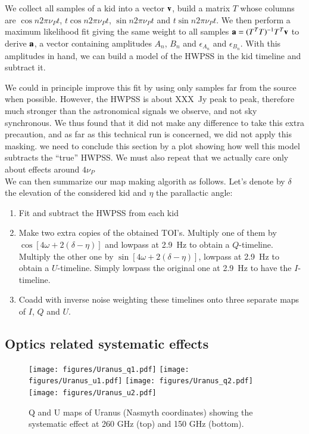 \documentclass[twocolumn,traditabstract]{aa}
\begin{document}
{We collect all samples of a kid into a vector ${\bf v}$, build a matrix $T$
whose columns are $\cos n2\pi\nu_Pt$, $t\cos n2\pi\nu_Pt$, $\sin n2\pi\nu_Pt$
and $t\sin n2\pi\nu_Pt$. We then perform a maximum likelihood fit giving the
same weight to all samples ${\bf a} =
(T^TT)^{-1}T^T{\bf v}$ to derive ${\bf a}$, a vector containing amplitudes $A_n$,
$B_n$ and $\epsilon_{A_n}$ and $\epsilon_{B_n}$. With this amplitudes in hand,
we can build a model of the HWPSS in the kid timeline and subtract it.

We could in principle improve this fit by using only samples far from the source
when possible. However, the HWPSS is about {\color{red}XXX~Jy} peak to peak,
therefore much stronger than the astronomical signals we observe, and not sky
synchronous. We thus found that it did not make any difference to take this
extra precaution, and as far as this technical run is concerned, we did not
apply this masking. {\color{red} we need to conclude this section by a plot
  showing how well this model subtracts the ``true'' HWPSS. We must also repeat
  that we actually care only about effects around $4\nu_P$}\\

We can then summarize our map making algorith as follows. Let's denote by
$\delta$ the elevation of the considered kid and $\eta$ the parallactic angle:

\begin{enumerate}
\item Fit and subtract the HWPSS from each kid
\item Make two extra copies of the obtained TOI's. Multiply one of them by
  $\cos[4\omega+2(\delta-\eta)]$ and lowpass at 2.9~Hz to obtain a
  $Q$-timeline. Multiply the other one by $\sin[4\omega+2(\delta-\eta)]$,
lowpass at 2.9~Hz to obtain a $U$-timeline. Simply lowpass the original one
  at 2.9~Hz to have the $I$-timeline.
\item Coadd with inverse noise weighting these timelines onto three separate
  maps of $I$, $Q$ and $U$.
\end{enumerate}

\subsection{Optics related systematic effects}

\begin{figure}
  \begin{center}
    \texttt{[image: figures/Uranus\_q1.pdf]}
    \texttt{[image: figures/Uranus\_u1.pdf]}
    \texttt{[image: figures/Uranus\_q2.pdf]}
    \texttt{[image: figures/Uranus\_u2.pdf]}
  \caption{ Q and U maps of Uranus (Nasmyth coordinates) showing
    the systematic effect at 260 GHz (top) and 150 GHz (bottom). }
  \label{fig:uranus_lkg}
  \end{center}
\end{figure}

}
\end{document}

